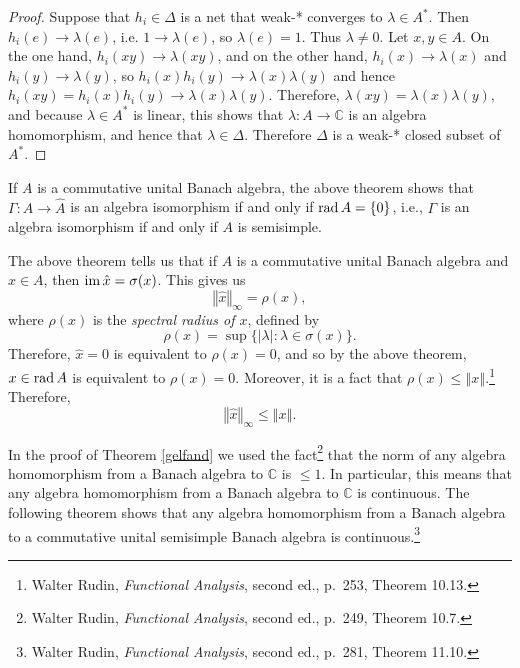 \documentclass{article}
\newcommand{\im}{\ensuremath\mathrm{im}\,}
\newcommand{\rad}{\ensuremath\mathrm{rad}\,}
\newcommand{\norm}[1]{\left\Vert #1 \right\Vert}
\theoremstyle{definition}
\begin{document}
\begin{proof}
Suppose that $h_i \in \Delta$ is a net that weak-* converges to $\lambda \in A^*$. Then $h_i(e) \to \lambda(e)$, i.e. $1 \to \lambda(e)$, so $\lambda(e)=1$. Thus $\lambda \neq 0$.
Let $x,y \in A$. On the one hand,
$h_i(xy) \to \lambda(xy)$, and on the other hand,
$h_i(x) \to \lambda(x)$ and $h_i(y) \to \lambda(y)$, 
so $h_i(x)h_i(y) \to \lambda(x)\lambda(y)$ and hence $h_i(xy)=h_i(x)h_i(y) \to \lambda(x)\lambda(y)$.
Therefore, $\lambda(xy)=\lambda(x)\lambda(y)$, and because $\lambda \in A^*$ is linear,
this shows that $\lambda:A \to \mathbb{C}$ is an algebra homomorphism, and hence that
$\lambda \in \Delta$. Therefore $\Delta$ is a weak-* closed subset of $A^*$.
\end{proof}

If $A$ is a commutative unital Banach algebra, the 
above theorem shows that 
$\Gamma:A \to \widehat{A}$ is an algebra isomorphism if and only if $\rad A=\{0\}$, i.e., $\Gamma$ is an algebra isomorphism if and only if 
$A$ is semisimple.

The above theorem tells us that if $A$ is a commutative unital Banach algebra and $x \in A$, then $\im \hat{x} = \sigma(x)$. This gives us 
\begin{equation}
\norm{\hat{x}}_\infty = \rho(x),
\label{spectralradius}
\end{equation}
where $\rho(x)$ is the {\em spectral radius of $x$}, defined by
\[
\rho(x) = \sup \{ |\lambda|: \lambda \in \sigma(x)\}.
\]
Therefore, $\hat{x}=0$ is equivalent to $\rho(x)=0$, and so by the above theorem,
$x \in \rad A$ is equivalent to $\rho(x)=0$.
Moreover, it is a fact that $\rho(x) \leq \norm{x}$.\footnote{Walter Rudin, {\em Functional Analysis}, second ed., p.~253, Theorem 10.13.} Therefore, 
\begin{equation}
\norm{\hat{x}}_\infty \leq \norm{x}.
\label{xhatnorm}
\end{equation}

In the proof of Theorem \ref{gelfand} we
used the fact\footnote{Walter Rudin, {\em Functional Analysis}, second ed., p.~249, Theorem 10.7.} that
the norm of any algebra homomorphism from a Banach algebra to $\mathbb{C}$ is $\leq 1$. In particular, this means that
any algebra homomorphism from a Banach algebra to $\mathbb{C}$ is continuous. The following theorem shows that
any algebra homomorphism from a Banach algebra to a commutative unital semisimple
Banach algebra is continuous.\footnote{Walter Rudin, {\em Functional Analysis}, second ed., p.~281, Theorem 11.10.}
\end{document}
